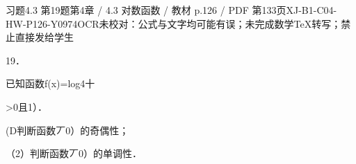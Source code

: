 \begin{bankitem}{习题4.3 第19题}{第4章 / 4.3 对数函数 / 教材 p.126 / PDF 第133页}{XJ-B1-C04-HW-P126-Y0974}{OCR未校对：公式与文字均可能有误；未完成数学TeX转写；禁止直接发给学生}
\begin{ocrdraft}
\par
19．
\par
已知函数f(x)=log4十
\par
>0且1）．
\par
(D判断函数丆0）的奇偶性；
\par
（2）判断函数丆0）的单调性．
\end{ocrdraft}
\end{bankitem}
